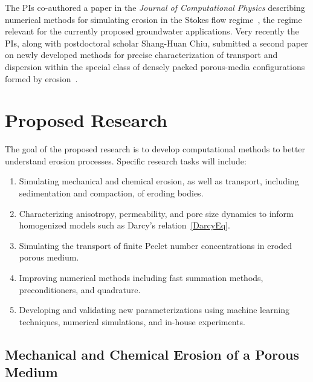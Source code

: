 \documentclass[11pt]{article}
\begin{document}
The PIs co-authored a paper in the {\em Journal of Computational Physics} describing numerical methods for simulating erosion in the Stokes flow regime~\cite{Quaife2018}, the regime relevant for the currently proposed groundwater applications. Very recently the PIs, along with postdoctoral scholar Shang-Huan Chiu, submitted a second paper on newly developed methods for precise characterization of transport and dispersion within the special class of densely packed porous-media configurations formed by erosion~\cite{chi-moo-qua2019}.

\section{Proposed Research} 
The goal of the proposed research is to develop computational methods to better understand erosion processes. Specific research tasks will include:
\begin{enumerate}[noitemsep,label=(\arabic*)]
  \item Simulating mechanical and chemical erosion, as well as transport, including sedimentation and compaction, of eroding bodies.

  \item Characterizing anisotropy, permeability, and pore size dynamics to inform homogenized models such as Darcy's relation~\eqref{DarcyEq}.

  \item Simulating the transport of finite Peclet number concentrations in eroded porous medium.

  \item Improving numerical methods including fast summation methods, preconditioners, and quadrature.  
  
  \item Developing and validating new parameterizations using machine learning techniques, numerical simulations, and in-house experiments.

\end{enumerate}



\subsection{Mechanical and Chemical Erosion of a Porous Medium}
\end{document}
